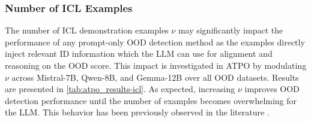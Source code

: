 \subsubsection{Number of ICL Examples}
The number of ICL demonstration examples $\nu$ may significantly impact the performance of any prompt-only OOD detection method as the examples directly inject relevant ID information which the LLM can use for alignment and reasoning on the OOD score. This impact is investigated in ATPO by modulating $\nu$ across Mistral-7B, Qwen-8B, and Gemma-12B over all OOD datasets. Results are presented in \ref{tab:atpo_results-icl}. As expected, increasing $\nu$ improves OOD detection performance until the number of examples becomes overwhelming for the LLM. This behavior has been previously observed in the literature \cite{wang2024beyond}.

